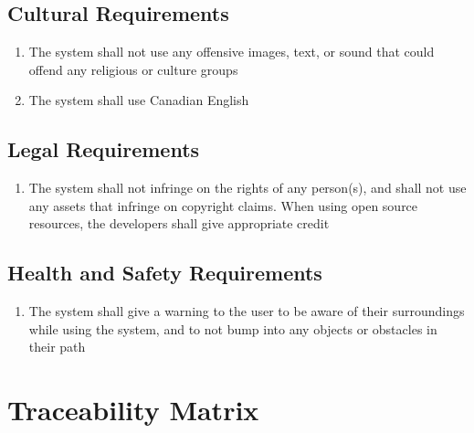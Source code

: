 \documentclass[12pt]{article}
\begin{document}
\subsection{Cultural Requirements}
\begin{enumerate}[CR\arabic*]
    \item The system shall not use any offensive images, text, or sound that could offend any religious or culture groups
    \item The system shall use Canadian English
\end{enumerate}
\subsection{Legal Requirements}
\begin{enumerate}[LR\arabic*]
    \item The system shall not infringe on the rights of any person(s), and shall not use any assets that infringe on copyright claims. When using open source resources, the developers shall give appropriate credit
\end{enumerate}
\subsection{Health and Safety Requirements}
\begin{enumerate}[HS\arabic*]
    \item The system shall give a warning to the user to be aware of their surroundings while using the system, and to not bump into any objects or obstacles in their path
\end{enumerate}

\section{Traceability Matrix}
\end{document}
